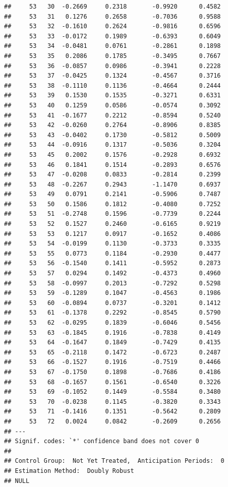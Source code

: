 \documentclass[
]{article}
\begin{document}
\begin{verbatim}
##     53   30  -0.2669     0.2318       -0.9920      0.4582 
##     53   31   0.1276     0.2658       -0.7036      0.9588 
##     53   32  -0.1610     0.2624       -0.9816      0.6596 
##     53   33  -0.0172     0.1989       -0.6393      0.6049 
##     53   34  -0.0481     0.0761       -0.2861      0.1898 
##     53   35   0.2086     0.1785       -0.3495      0.7667 
##     53   36  -0.0857     0.0986       -0.3941      0.2228 
##     53   37  -0.0425     0.1324       -0.4567      0.3716 
##     53   38  -0.1110     0.1136       -0.4664      0.2444 
##     53   39   0.1530     0.1535       -0.3271      0.6331 
##     53   40   0.1259     0.0586       -0.0574      0.3092 
##     53   41  -0.1677     0.2212       -0.8594      0.5240 
##     53   42  -0.0260     0.2764       -0.8906      0.8385 
##     53   43  -0.0402     0.1730       -0.5812      0.5009 
##     53   44  -0.0916     0.1317       -0.5036      0.3204 
##     53   45   0.2002     0.1576       -0.2928      0.6932 
##     53   46   0.1841     0.1514       -0.2893      0.6576 
##     53   47  -0.0208     0.0833       -0.2814      0.2399 
##     53   48  -0.2267     0.2943       -1.1470      0.6937 
##     53   49   0.0791     0.2141       -0.5906      0.7487 
##     53   50   0.1586     0.1812       -0.4080      0.7252 
##     53   51  -0.2748     0.1596       -0.7739      0.2244 
##     53   52   0.1527     0.2460       -0.6165      0.9219 
##     53   53   0.1217     0.0917       -0.1652      0.4086 
##     53   54  -0.0199     0.1130       -0.3733      0.3335 
##     53   55   0.0773     0.1184       -0.2930      0.4477 
##     53   56  -0.1540     0.1411       -0.5952      0.2873 
##     53   57   0.0294     0.1492       -0.4373      0.4960 
##     53   58  -0.0997     0.2013       -0.7292      0.5298 
##     53   59  -0.1289     0.1047       -0.4563      0.1986 
##     53   60  -0.0894     0.0737       -0.3201      0.1412 
##     53   61  -0.1378     0.2292       -0.8545      0.5790 
##     53   62  -0.0295     0.1839       -0.6046      0.5456 
##     53   63  -0.1845     0.1916       -0.7838      0.4149 
##     53   64  -0.1647     0.1849       -0.7429      0.4135 
##     53   65  -0.2118     0.1472       -0.6723      0.2487 
##     53   66  -0.1527     0.1916       -0.7519      0.4466 
##     53   67  -0.1750     0.1898       -0.7686      0.4186 
##     53   68  -0.1657     0.1561       -0.6540      0.3226 
##     53   69  -0.1052     0.1449       -0.5584      0.3480 
##     53   70  -0.0238     0.1145       -0.3820      0.3343 
##     53   71  -0.1416     0.1351       -0.5642      0.2809 
##     53   72   0.0024     0.0842       -0.2609      0.2656 
## ---
## Signif. codes: `*' confidence band does not cover 0
## 
## Control Group:  Not Yet Treated,  Anticipation Periods:  0
## Estimation Method:  Doubly Robust
## NULL
\end{verbatim}
\end{document}
